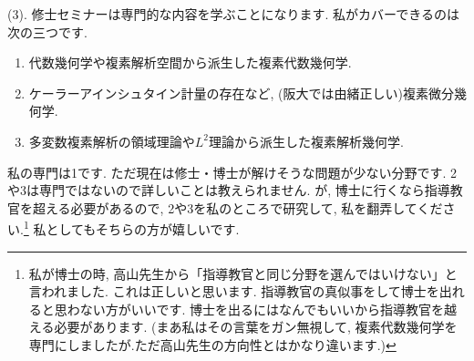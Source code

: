 (3). 修士セミナーは専門的な内容を学ぶことになります. 私がカバーできるのは次の三つです. 
\begin{enumerate}
  \setlength{\parskip}{0cm} %
  \setlength{\itemsep}{0pt} %
  \item 代数幾何学や複素解析空間から派生した複素代数幾何学. 
\item ケーラーアインシュタイン計量の存在など, (阪大では由緒正しい)複素微分幾何学.
\item 多変数複素解析の領域理論や$L^2$理論から派生した複素解析幾何学.
\end{enumerate}
私の専門は1です. ただ現在は修士・博士が解けそうな問題が少ない分野です.  
2や3は専門ではないので詳しいことは教えられません. 
が, 博士に行くなら指導教官を超える必要があるので, 2や3を私のところで研究して, 私を翻弄してください.\footnote{私が博士の時, 高山先生から「指導教官と同じ分野を選んではいけない」と言われました. これは正しいと思います. 指導教官の真似事をして博士を出れると思わない方がいいです. 博士を出るにはなんでもいいから指導教官を越える必要があります. (まあ私はその言葉をガン無視して, 複素代数幾何学を専門にしましたが.ただ高山先生の方向性とはかなり違います.)} 
私としてもそちらの方が嬉しいです. 

